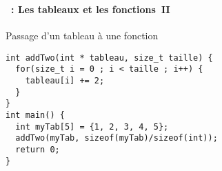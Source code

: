 \begin{frame}[containsverbatim]
  \frametitle{\secname}
  \framesubtitle{\subsecname~: Les tableaux et les fonctions~II}

  \begin{exampleblock}{Passage d'un tableau à une fonction}
    \begin{verbatim}
int addTwo(int * tableau, size_t taille) {
  for(size_t i = 0 ; i < taille ; i++) {
    tableau[i] += 2;
  }
}
int main() {
  int myTab[5] = {1, 2, 3, 4, 5};
  addTwo(myTab, sizeof(myTab)/sizeof(int));
  return 0;
}\end{verbatim}
  \end{exampleblock}
\end{frame}

